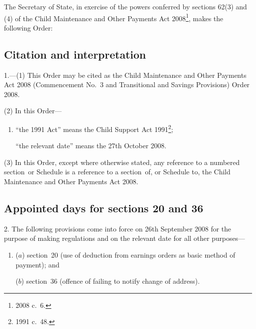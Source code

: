 \documentclass[12pt,a4paper]{article}
\title{\regstitle}
\author{S.I.\ 2008 No.\ 2548 (C.~110)}
\date{Made
25th September 2008
}
\begin{document}
\maketitle

\noindent
The Secretary of State, in exercise of the powers conferred by sections 62(3) and (4) of the Child Maintenance and Other Payments Act 2008\footnote{2008 c.~6.}, makes the following Order: 

{\sloppy

\tableofcontents

}

\bigskip

\setcounter{secnumdepth}{-2}

\subsection[1. Citation and interpretation]{Citation and interpretation}

1.---(1)  This Order may be cited as the Child Maintenance and Other Payments Act 2008 (Commencement No.~3 and Transitional and Savings Provisions) Order 2008.

(2) In this Order—
\begin{enumerate}\item[]
“the 1991 Act” means the Child Support Act 1991\footnote{1991 c.~48.};

“the relevant date” means the 27th October 2008.
\end{enumerate}

(3) In this Order, except where otherwise stated, any reference to a numbered section~or Schedule is a reference to a section~of, or Schedule to, the Child Maintenance and Other Payments Act 2008.

\subsection[2. Appointed days for sections 20 and 36]{Appointed days for sections 20 and 36}

2.  The following provisions come into force on 26th September 2008 for the purpose of making regulations and on the relevant date for all other purposes—
\begin{enumerate}\item[]
($a$) section~20 (use of deduction from earnings orders as basic method of payment); and

($b$) section~36 (offence of failing to notify change of address).
\end{enumerate}
\end{document}

